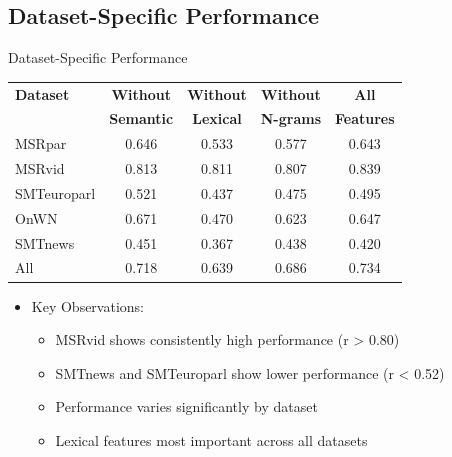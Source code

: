 \documentclass{beamer}
\begin{document}
\subsection{Dataset-Specific Performance}
\begin{frame}{Dataset-Specific Performance}
    \begin{center}
        \begin{tabular}{|l|c|c|c|c|}
            \hline
            \textbf{Dataset} & \textbf{Without} & \textbf{Without} & \textbf{Without} & \textbf{All} \\
            & \textbf{Semantic} & \textbf{Lexical} & \textbf{N-grams} & \textbf{Features} \\
            \hline
            MSRpar & 0.646 & 0.533 & 0.577 & 0.643 \\
            MSRvid & 0.813 & 0.811 & 0.807 & 0.839 \\
            SMTeuroparl & 0.521 & 0.437 & 0.475 & 0.495 \\
            OnWN & 0.671 & 0.470 & 0.623 & 0.647 \\
            SMTnews & 0.451 & 0.367 & 0.438 & 0.420 \\
            \hline
            All & 0.718 & 0.639 & 0.686 & 0.734 \\
            \hline
        \end{tabular}
    \end{center}
    \begin{itemize}
        \item Key Observations:
        \begin{itemize}
            \item MSRvid shows consistently high performance (r \textgreater{} 0.80)
            \item SMTnews and SMTeuroparl show lower performance (r \textless{} 0.52)
            \item Performance varies significantly by dataset
            \item Lexical features most important across all datasets
        \end{itemize}
    \end{itemize}
\end{frame}

\end{document}
